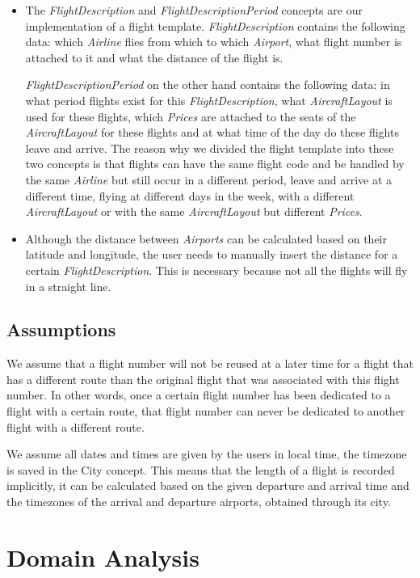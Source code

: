 \documentclass[a4paper,11pt]{article}
\newcommand{\npar}{\par \vspace{2.3ex plus 0.3ex minus 0.3ex} \noindent}
\newcommand{\spar}{\par \noindent}
\newcommand{\dsltype}[1]{\textit{#1}}
\begin{document}
\begin{itemize}
\item The \dsltype{FlightDescription} and \dsltype{FlightDescriptionPeriod} concepts are our implementation of a flight template. \dsltype{FlightDescription} contains the following data: which \dsltype{Airline} flies from which to which \dsltype{Airport}, what flight number is attached to it and what the distance of the flight is.
\spar \dsltype{FlightDescriptionPeriod} on the other hand contains the following data: in what period flights exist for this \dsltype{FlightDescription}, what \dsltype{AircraftLayout} is used for these flights, which \dsltype{Prices} are attached to the seats of the \dsltype{AircraftLayout} for these flights and at what time of the day do these flights leave and arrive. The reason why we divided the flight template into these two concepts is that flights can have the same flight code and be handled by the same \dsltype{Airline} but still occur in a different period, leave and arrive at a different time, flying at different days in the week, with a different \dsltype{AircraftLayout} or with the same \dsltype{AircraftLayout} but different \dsltype{Prices}.

\item Although the distance between \dsltype{Airports} can be calculated based on their latitude and longitude, the user needs to manually insert the distance for a certain \dsltype{FlightDescription}. This is necessary because not all the flights will fly in a straight line.
\end{itemize}

\subsection{Assumptions}

We assume that a flight number will not be reused at a later time for a flight that has a different route than the original flight that was associated with this flight number. In other words, once a certain flight number has been dedicated to a flight with a certain route, that flight number can never be dedicated to another flight with a different route.

\npar We assume all dates and times are given by the users in local time, the timezone is saved in the City concept. This means that the length of a flight is recorded implicitly, it can be calculated based on the given departure and arrival time and the timezones of the arrival and departure airports, obtained through its city.

\section{Domain Analysis}
\end{document}
